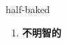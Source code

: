 
\begin{frame}
{\huge half-baked}
\begin{center}
\begin{enumerate}\Large
  \item \textbf{不明智的}
\end{enumerate}
\end{center}
\end{frame}
